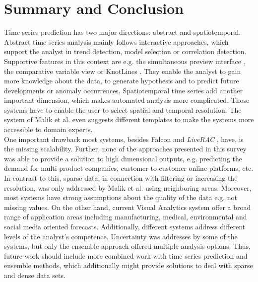 \documentclass[electronic]{vgtc}             %
\begin{document}
\section{Summary and Conclusion}
Time series prediction has two major directions: abstract and spatiotemporal.
Abstract time series analysis mainly follows interactive approaches, which
support the analyst in trend detection, model selection or correlation detection. 
Supportive features in this context are e.g. the simultaneous preview interface \cite{buono:2007}, the comparative variable view \cite{steed:2017} or KnotLines \cite{Xie:2014}.
They enable the analyst to gain more knowledge about the data, to generate hypothesis and to predict future developments or anomaly occurrences.
Spatiotemporal time series add another important dimension, which makes automated analysis more complicated. 
Those systems have to enable the user to select spatial and temporal resolution.
The system of Malik et al. \cite{malik:2014} even suggests different templates to make the systems more accessible to domain experts.\\
One important drawback most systems, besides Falcon \cite{steed:2017} and \textit{LiveRAC} \cite{McLachlan:2008}, have, is the missing scalability. 
Further, none of the approaches presented in this survey was able to provide a solution to high dimensional outputs, e.g. predicting the demand for multi-product companies, customer-to-customer online platforms, etc.
In contrast to this, sparse data, in connection with filtering or increasing the resolution, was only addressed by Malik et al. \cite{malik:2014} using neighboring areas.
Moreover, most systems have strong assumptions about the quality of the data e.g. not missing values.
On the other hand, current Visual Analytics system offer a broad range of application areas including manufacturing, medical, environmental and social media oriented forecasts.
Additionally, different systems address different levels of the analyst's competence.
Uncertainty was addresses by some of the systems, but only the ensemble approach \cite{koepp:2014} offered multiple analysis options.
Thus, future work should include more combined work with time series prediction and ensemble methods, which additionally might provide solutions to deal with sparse and dense data sets.

%
%
%

%


\end{document}
